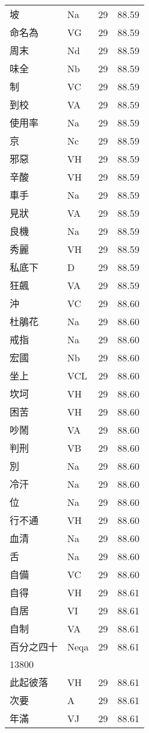 \documentclass[twocolumn]{book}
\begin{document}
\begin{supertabular}{llrr}
坡 & Na & 29 &  88.59\\
命名為 & VG & 29 &  88.59\\
周末 & Nd & 29 &  88.59\\
味全 & Nb & 29 &  88.59\\
制 & VC & 29 &  88.59\\
到校 & VA & 29 &  88.59\\
使用率 & Na & 29 &  88.59\\
京 & Nc & 29 &  88.59\\
邪惡 & VH & 29 &  88.59\\
辛酸 & VH & 29 &  88.59\\
車手 & Na & 29 &  88.59\\
見狀 & VA & 29 &  88.59\\
良機 & Na & 29 &  88.59\\
秀麗 & VH & 29 &  88.59\\
私底下 & D & 29 &  88.59\\
狂飆 & VA & 29 &  88.59\\
沖 & VC & 29 &  88.60\\
杜鵑花 & Na & 29 &  88.60\\
戒指 & Na & 29 &  88.60\\
宏國 & Nb & 29 &  88.60\\
坐上 & VCL & 29 &  88.60\\
坎坷 & VH & 29 &  88.60\\
困苦 & VH & 29 &  88.60\\
吵鬧 & VA & 29 &  88.60\\
判刑 & VB & 29 &  88.60\\
別 & Na & 29 &  88.60\\
冷汗 & Na & 29 &  88.60\\
位 & Na & 29 &  88.60\\
行不通 & VH & 29 &  88.60\\
血清 & Na & 29 &  88.60\\
舌 & Na & 29 &  88.60\\
自備 & VC & 29 &  88.60\\
自得 & VH & 29 &  88.61\\
自居 & VI & 29 &  88.61\\
自制 & VA & 29 &  88.61\\
百分之四十 & Neqa & 29 &  88.61\\
13800\\
此起彼落 & VH & 29 &  88.61\\
次要 & A & 29 &  88.61\\
年滿 & VJ & 29 &  88.61\\

\end{supertabular}
\end{document}
